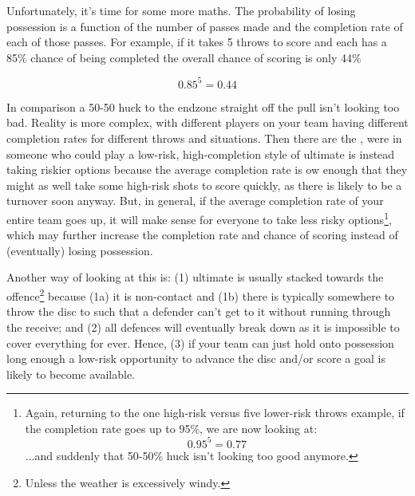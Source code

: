 \documentclass{tufte-handout}
\begin{document}
Unfortunately, it's time for some more maths. 
The probability 
of losing possession
is a function of 
the number of passes made 
and the completion rate of 
each of those passes.
For example,  
if it takes 5 throws
to score and 
each has a 85\% chance 
of being completed
the overall chance 
of scoring is only 44\%
\begin{marginfigure}
\begin{equation} 0.85^5 = 0.44 \end{equation}
\end{marginfigure} 
In comparison
a 50-50 huck
to the endzone
straight off the pull 
isn't looking too bad.
Reality is more complex, 
with different players 
on your team 
having different 
completion rates 
for different throws 
and situations. 
Then there are the 
,  
were in someone who could play a
low-risk, high-completion 
style of ultimate 
is instead taking riskier options 
because the average 
completion rate is 
ow enough that 
they might as well
take some high-risk
shots to score quickly, 
as there is likely to be 
a turnover soon anyway.
But, in general, 
if the average completion rate 
of your entire team goes up, 
it will make sense 
for everyone 
to take less risky options\footnote{
Again, returning to the one high-risk  
versus five lower-risk throws example, 
if the completion rate goes up 
to 95\%, we are now looking at: 
\begin{equation} 0.95^5 = 0.77 \end{equation}
...and suddenly that 50-50\% huck 
isn't looking too good anymore.}, 
which may further 
increase the completion rate
and chance of scoring
instead of 
(eventually)
losing possession.  

Another way of looking at this 
is: (1) ultimate
is usually stacked towards 
the offence\footnote{
Unless the weather is 
excessively 
windy.} 
because (1a) it is non-contact 
and (1b) there is 
typically 
somewhere
to throw the disc to 
such that a defender 
can't get to it without running 
through the receive; 
and (2) all defences 
will eventually 
break down 
as it is impossible to 
cover everything 
for ever. 
Hence, 
(3) if your team 
can just hold onto
possession 
long enough
a low-risk
opportunity to 
advance the disc 
and/or score a goal 
is likely to 
become 
available. 
\end{document}
